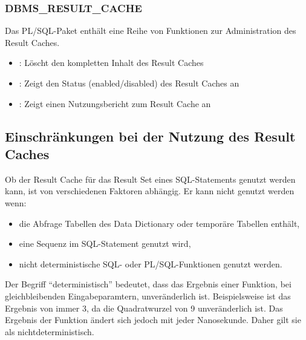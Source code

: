         \subsubsection{DBMS\_RESULT\_CACHE}
          Das PL/SQL-Paket  enthält eine Reihe von Funktionen zur Administration des Result Caches.
          \begin{itemize}
            \item {}: Löscht den kompletten Inhalt des Result Caches
            \item {}: Zeigt den Status (enabled/disabled) des Result Caches an
            \item {}: Zeigt einen Nutzungsbericht zum Result Cache an
          \end{itemize}
      \subsection{Einschränkungen bei der Nutzung des Result Caches}
        Ob der Result Cache für das Result Set eines SQL-Statements genutzt werden kann, ist von verschiedenen Faktoren abhängig. Er kann nicht genutzt werden wenn:
        \begin{itemize}
          \item die Abfrage Tabellen des Data Dictionary oder temporäre Tabellen enthält,
          \item eine Sequenz im SQL-Statement genutzt wird,
          \item nicht deterministische SQL- oder PL/SQL-Funktionen genutzt werden.
        \end{itemize}
        \begin{merke}
          Der Begriff \enquote{deterministisch} bedeutet, dass das Ergebnis
          einer Funktion, bei gleichbleibenden Eingabeparamtern,
          unveränderlich ist. Beispielsweise ist das Ergebnis von
           immer 3, da die Quadratwurzel von 9
          unveränderlich ist. Das Ergebnis der Funktion
           ändert sich jedoch mit jeder Nanosekunde. Daher gilt sie als nichtdeterministisch.
        \end{merke}
